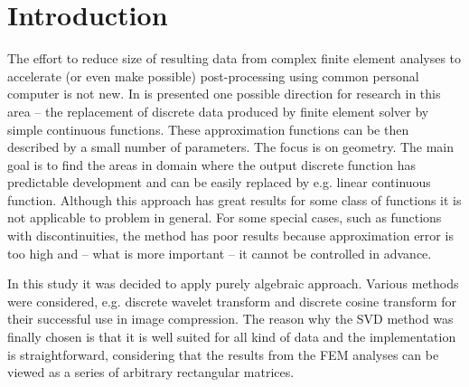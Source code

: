 \section{Introduction}
\label{sec:introduction}


The effort to reduce size of resulting data from complex finite element analyses to accelerate (or even make possible) post-processing using common personal computer is not new. In \cite{Benes2016} is presented one possible direction for research in this area -- the replacement of discrete data produced by finite element solver by simple continuous functions. These approximation functions can be then described by a small number of parameters. The focus is on geometry. The main goal is to find the areas in domain where the output discrete function has predictable development and can be easily replaced by e.g. linear continuous function. Although this approach has great results for some class of functions it is not applicable to problem in general. For some special cases, such as functions with discontinuities, the method has poor results because approximation error is too high and -- what is more important -- it cannot be controlled in advance.

In this study it was decided to apply purely algebraic approach. Various methods were considered, e.g. discrete wavelet transform \cite{Lui2001} and discrete cosine transform \cite{Watson1994} for their successful use in image compression. The reason why the SVD method was finally chosen is that it is well suited for all kind of data and the implementation is straightforward, considering that the results from the FEM analyses can be viewed as a series of arbitrary rectangular matrices.

